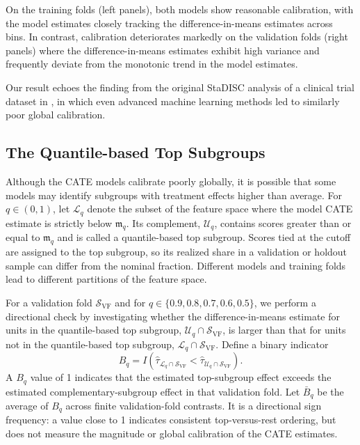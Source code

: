 \documentclass[12pt]{article}
\begin{document}
On the training folds (left panels), both models show reasonable calibration, with the model estimates closely tracking the difference-in-means estimates across bins. In contrast, calibration deteriorates markedly on the validation folds (right panels) where the difference-in-means estimates exhibit high variance and frequently deviate from the monotonic trend in the model estimates.

Our result echoes the finding from the original StaDISC analysis of a clinical trial dataset in \cite{dwivedi2020}, in which even advanced machine learning methods led to similarly poor global calibration.

\begingroup{}


\endgroup

\subsection{The Quantile-based Top Subgroups}

Although the CATE models calibrate poorly globally, it is possible that some models may identify subgroups with treatment effects higher than average. For $q\in (0,1)$, let $\mathcal{L}_q$ denote the subset of the feature space where the model CATE estimate is strictly below $\mathfrak{m}_{q}$. Its complement, $\mathcal{U}_q$, contains scores greater than or equal to $\mathfrak{m}_{q}$ and is called a quantile-based top subgroup. Scores tied at the cutoff are assigned to the top subgroup, so its realized share in a validation or holdout sample can differ from the nominal fraction. Different models and training folds lead to different partitions of the feature space.

For a validation fold $\mathcal{S}_{\text{VF}}$ and for $q \in \{0.9,0.8,0.7,0.6,0.5\}$, we perform a directional check by investigating whether the difference-in-means estimate for units in the quantile-based top subgroup, $\mathcal{U}_q \cap \mathcal{S}_{\text{VF}}$, is larger than that for units not in the quantile-based top subgroup, $\mathcal{L}_q \cap \mathcal{S}_{\text{VF}}$. Define a binary indicator
\begin{equation*}
B_q = I\left(\widehat{\tau}_{\mathcal{L}_q \cap \mathcal{S}_{\text{VF}}}<  \widehat{\tau}_{\mathcal{U}_q \cap \mathcal{S}_{\text{VF}}}\right).
\end{equation*}
A $B_q$ value of 1 indicates that the estimated top-subgroup effect exceeds the estimated complementary-subgroup effect in that validation fold. Let $\bar{B}_q$ be the average of $B_q$ across finite validation-fold contrasts. It is a directional sign frequency: a value close to 1 indicates consistent top-versus-rest ordering, but does not measure the magnitude or global calibration of the CATE estimates.
\end{document}
